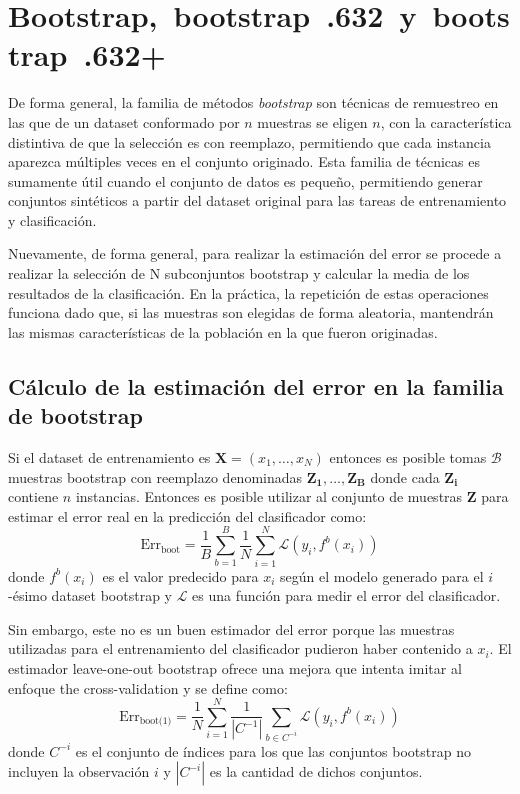 \documentclass{article}
\begin{document}
\section{Bootstrap, bootstrap .632 y bootstrap .632+}
De forma general, la familia de métodos \emph{bootstrap} son técnicas de remuestreo en las que de un dataset conformado por $n$ muestras se eligen $n$, con la característica distintiva de que la selección es con reemplazo, permitiendo que cada instancia aparezca múltiples veces en el conjunto originado.
Esta familia de técnicas es sumamente útil cuando el conjunto de datos es pequeño, permitiendo generar conjuntos sintéticos a partir del dataset original para las tareas de entrenamiento y clasificación.

Nuevamente, de forma general, para realizar la estimación del error se procede a realizar la selección de N subconjuntos bootstrap y calcular la media de los resultados de la clasificación.
En la práctica, la repetición de estas operaciones funciona dado que, si las muestras son elegidas de forma aleatoria, mantendrán las mismas características de la población en la que fueron originadas.

\subsection{Cálculo de la estimación del error en la familia de bootstrap} 
Si el dataset de entrenamiento es $\mathbf{X} = (x_1,\ldots,x_N)$ entonces es posible tomas $\mathcal{B}$ muestras bootstrap con reemplazo denominadas $\mathbf{Z_1}, \ldots, \mathbf{Z_B}$ donde cada $\mathbf{Z_i}$ contiene $n$ instancias.
Entonces es posible utilizar al conjunto de muestras $\mathbf{Z}$ para estimar el error real en la predicción del clasificador como:
$$
\text{Err}_{\text{boot}} = \frac{1}{B} \sum_{b=1}^{B} \frac{1}{N} \sum_{i=1}^{N} \mathcal{L}(y_i, f^b(x_i))
$$
donde $f^b(x_i)$ es el valor predecido para $x_i$ según el modelo generado para el $i$-ésimo dataset bootstrap y $\mathcal{L}$ es una función para medir el error del clasificador.

Sin embargo, este no es un buen estimador del error porque las muestras utilizadas para el entrenamiento del clasificador pudieron haber contenido a $x_i$.
El estimador leave-one-out bootstrap ofrece una mejora que intenta imitar al enfoque the cross-validation y se define como:
$$
\text{Err}_{\text{boot(1)}} = \frac{1}{N} \sum_{i=1}^N \frac{1}{|C^{-1}|} \sum_{b \in C^{-i}} \mathcal{L}(y_i, f^b(x_i))
$$
donde $C^{-i}$ es el conjunto de índices para los que las conjuntos bootstrap no incluyen la observación $i$ y $|C^{-i}|$ es la cantidad de dichos conjuntos.
\end{document}
